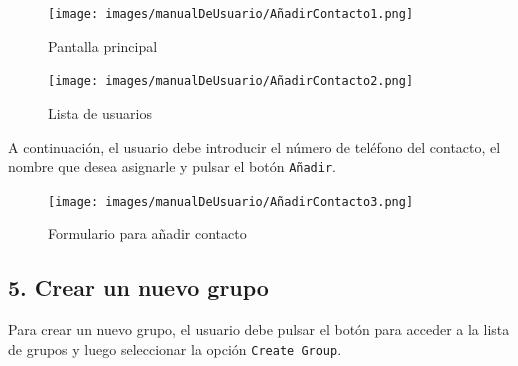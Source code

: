 \begin{figure}[H]
    \centering
    \begin{minipage}[b]{0.48\textwidth}
        \centering
        \texttt{[image: images/manualDeUsuario/AñadirContacto1.png]}
        \caption*{Pantalla principal}
    \end{minipage}
    \hfill
    \begin{minipage}[b]{0.48\textwidth}
        \centering
        \texttt{[image: images/manualDeUsuario/AñadirContacto2.png]}
        \caption*{Lista de usuarios}
    \end{minipage}
\end{figure}

A continuación, el usuario debe introducir el número de teléfono del contacto, el nombre que desea asignarle y pulsar el botón \texttt{Añadir}.

\begin{figure}[H]
    \centering
    \texttt{[image: images/manualDeUsuario/AñadirContacto3.png]}
    \caption*{Formulario para añadir contacto}
\end{figure}

\subsection*{5. Crear un nuevo grupo}
Para crear un nuevo grupo, el usuario debe pulsar el botón para acceder a la lista de grupos y luego seleccionar la opción \texttt{Create Group}.

